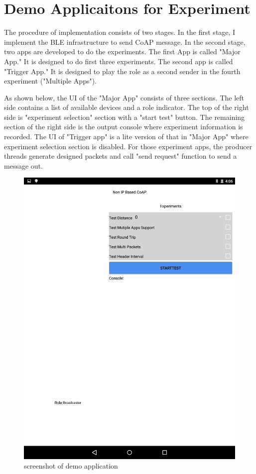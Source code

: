\documentclass{Nan_Thesis}
\begin{document}
\section{Demo Applicaitons for Experiment}
The procedure of implementation consists of two stages. In the first stage, I implement the BLE infrastructure to send CoAP message. In the second stage, two apps are developed to do the experiments. The first App is called "Major App." It is designed to do first three experiments. The second app is called "Trigger App." It is designed to play the role as a second sender in the fourth experiment ("Multiple Apps").

As shown below, the UI of the "Major App" consists of three sections. The left side contains a list of available devices and a role indicator. The top of the right side is "experiment selection" section with a "start test" button. The remaining section of the right side is the output console where experiment information is recorded. The UI of "Trigger app" is a lite version of that in "Major App" where experiment selection section is disabled. For those experiment apps, the producer threads generate designed packets and call "send request" function to send a message out.

\newpage
\begin{figure}[H]
  \centering 
      \includegraphics[scale=0.3]{pic/experimentsceenshot.png} 
  \caption{screenshot of demo application}
\end{figure}  
\end{document}
